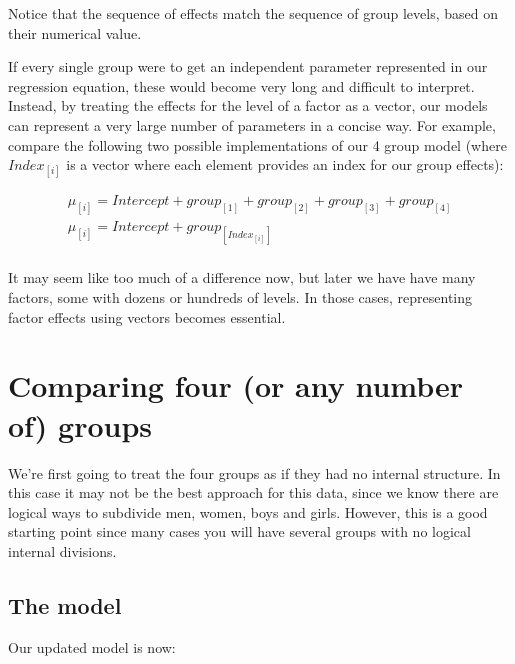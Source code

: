 \documentclass[
]{book}
\begin{document}
Notice that the sequence of effects match the sequence of group levels, based on their numerical value.

If every single group were to get an independent parameter represented in our regression equation, these would become very long and difficult to interpret. Instead, by treating the effects for the level of a factor as a vector, our models can represent a very large number of parameters in a concise way. For example, compare the following two possible implementations of our 4 group model (where \(Index_{[i]}\) is a vector where each element provides an index for our group effects):

\begin{equation}
\begin{split}
\mu_{[i]} = Intercept + group_{[1]} + group_{[2]} + group_{[3]} + group_{[4]} \\
\mu_{[i]} = Intercept + group_{[Index_{[i]}]} \\
\end{split}
\label{eq:40}
\end{equation}

It may seem like too much of a difference now, but later we have have many factors, some with dozens or hundreds of levels. In those cases, representing factor effects using vectors becomes essential.

\hypertarget{comparing-four-or-any-number-of-groups}{%
\section{Comparing four (or any number of) groups}\label{comparing-four-or-any-number-of-groups}}

We're first going to treat the four groups as if they had no internal structure. In this case it may not be the best approach for this data, since we know there are logical ways to subdivide men, women, boys and girls. However, this is a good starting point since many cases you will have several groups with no logical internal divisions.

\hypertarget{the-model}{%
\subsection{The model}\label{the-model}}

Our updated model is now:
\end{document}
